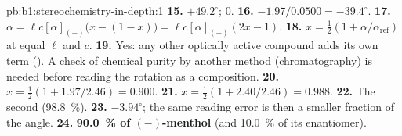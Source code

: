 \begin{solution}{pb:b1:stereochemistry-in-depth:1}
\textbf{15.} $+49.2^\circ$; $0$.
\textbf{16.} $-1.97/0.0500 = -39.4^\circ$.
\textbf{17.} $\alpha = \ell c[\alpha]_{(-)}\bigl(x - (1 - x)\bigr) =
\ell c[\alpha]_{(-)}(2x - 1)$.
\textbf{18.} $x = \frac12(1 + \alpha/\alpha_{\text{ref}})$ at equal $\ell$ and $c$.
\textbf{19.} Yes: any other optically active compound adds its own term
(). A check of chemical purity by another method
(chromatography) is needed before reading the rotation as a composition.
\textbf{20.} $x = \frac12(1 + 1.97/2.46) = 0.900$.
\textbf{21.} $x = \frac12(1 + 2.40/2.46) = 0.988$.
\textbf{22.} The second (\qty{98.8}{\percent}).
\textbf{23.} $-3.94^\circ$; the same reading error is then a smaller
fraction of the angle.
\textbf{24.} \textbf{\qty{90.0}{\percent} of $(-)$-menthol} (and
\qty{10.0}{\percent} of its enantiomer).
\end{solution}
